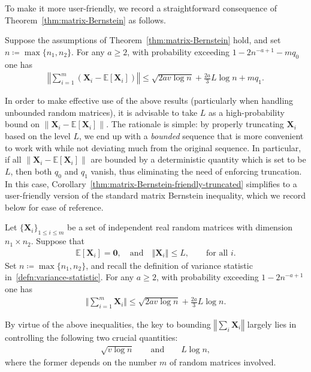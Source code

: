 To make it more user-friendly, we record a straightforward consequence of Theorem~\ref{thm:matrix-Bernstein} as follows.
%
\begin{corollary}
\label{thm:matrix-Bernstein-friendly-truncated}
	Suppose the assumptions of Theorem~\ref{thm:matrix-Bernstein} hold, and set $n\coloneqq\max\{n_1,n_2\}$. For any $a\geq 2$, with probability exceeding $1-2n^{-a+1}-mq_0$ one has
	\begin{align}
		\left\Vert \sum_{i=1}^m (\bm{X}_{i} - \mathbb{E}\left[\bm{X}_{i}\right]) \right\Vert \leq \sqrt{2a v \log n } + \frac{2a}{3}L\log n  + mq_1.
	\end{align}
\end{corollary}
%
In order to make effective use of the above results (particularly when handling unbounded random matrices), it is advisable to take $L$ as a high-probability bound on $\|\bm{X}_i -  \mathbb{E}\left[\bm{X}_{i}\right]  \|$.
The rationale is simple: by properly truncating $\bm{X}_i$ based on the level $L$,
we end up with a {\em bounded} sequence that is more convenient to work with while not deviating much  from the original sequence.
In particular,  if all $\|\bm{X}_i-  \mathbb{E}\left[\bm{X}_{i}\right] \|$ are bounded by a deterministic quantity which is set to be $L$,
then both $q_0$ and $q_1$ vanish, thus eliminating the need of enforcing truncation.
In this case, Corollary~\ref{thm:matrix-Bernstein-friendly-truncated} simplifies to a user-friendly version of the standard matrix Bernstein inequality, which we record below for ease of reference.
%
\begin{corollary}
\label{thm:matrix-Bernstein-friendly}
		Let $\{\bm{X}_{i}\}_{1 \leq i \leq m}$
be a set of independent real random matrices with dimension $n_{1}\times n_{2}$. Suppose that
%
\begin{align}
\mathbb{E}\left[\bm{X}_{i}\right]=\bm{0},
	\quad \text{and} \quad
	\left\Vert \bm{X}_{i}\right\Vert \leq L,\qquad\text{for all } i.
	\label{eq:mean-zero-bound-B}
\end{align}
%
Set $n\coloneqq\max\{n_1,n_2\}$, and recall the definition of variance statistic in~\eqref{defn:variance-statistic}. For any $a\geq 2$, with probability exceeding $1-2n^{-a+1}$ one has
	\begin{align}
		\Bigg\Vert \sum_{i=1}^m \bm{X}_{i} \Bigg\Vert \leq \sqrt{2a v \log n } + \frac{2a}{3}L\log n.
	\end{align}
\end{corollary}
%

By virtue of the above  inequalities, the key to bounding  $\left\Vert \sum\nolimits_{i}\bm{X}_{i}\right\Vert$ largely lies in controlling the following  two crucial quantities:
%
\begin{align*}
	\sqrt{v\log n} \qquad \text{and} \qquad L\log n,
\end{align*}
%
where the former depends on the number $m$ of random matrices involved.




